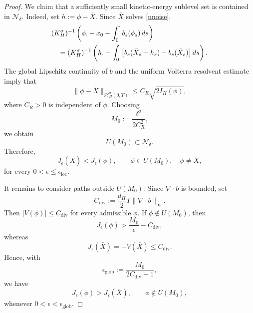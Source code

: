 \documentclass[preprint,12pt]{elsarticle}
\theoremstyle{definition}
\theoremstyle{plain}
\begin{document}
\begin{proof}
We claim that a sufficiently small kinetic-energy sublevel set is
contained in $\mathcal N_\delta$. Indeed, set
$h:=\phi-\bar X$. Since $\bar X$ solves \eqref{nnoise},
\begin{align}
& (K_H^\sigma)^{-1}
\left(
    \phi_\cdot-x_0
    -
    \int_0^\cdot b_s(\phi_s)\,ds
\right)
\notag\\
&\quad=
(K_H^\sigma)^{-1}
\left(
    h_\cdot
    -
    \int_0^\cdot
    \bigl[
        b_s(\bar X_s+h_s)-b_s(\bar X_s)
    \bigr]\,ds
\right).
\label{eq:residual-difference}
\end{align}
The global Lipschitz continuity of $b$ and the uniform Volterra
resolvent estimate imply that
\begin{equation}
\label{eq:H-distance-controlled-by-IH}
    \|\phi-\bar X\|_{\mathcal H_H^\sigma(0,T)}
    \leq
    C_R\sqrt{2I_H(\phi)},
\end{equation}
where $C_R>0$ is independent of $\phi$. Choosing
\begin{equation}
\label{eq:M0-def}
    M_0
    :=
    \frac{\delta^2}{2C_R^2},
\end{equation}
we obtain
\begin{equation*}
    U(M_0)\subset\mathcal N_\delta.
\end{equation*}
Therefore,
\begin{equation}
\label{eq:min-on-UM0}
    J_\epsilon(\bar X)
    <
    J_\epsilon(\phi),
    \qquad
    \phi\in U(M_0),\quad
    \phi\neq\bar X,
\end{equation}
for every $0<\epsilon\leq\epsilon_{\mathrm{loc}}$.

It remains to consider paths outside $U(M_0)$. Since
$\nabla\!\cdot b$ is bounded, set
\begin{equation*}
    C_{\mathrm{div}}
    :=
    \frac{d_H}{2}
    T
    \|\nabla\!\cdot b\|_\infty.
\end{equation*}
Then $|V(\phi)|\leq C_{\mathrm{div}}$ for every admissible $\phi$.
If $\phi\notin U(M_0)$, then
\begin{equation}
\label{eq:J-lower-outside}
    J_\epsilon(\phi)
    >
    \frac{M_0}{\epsilon}
    -
    C_{\mathrm{div}},
\end{equation}
whereas
\begin{equation*}
    J_\epsilon(\bar X)
    =
    -V(\bar X)
    \leq
    C_{\mathrm{div}}.
\end{equation*}
Hence, with
\begin{equation}
\label{eq:eps-global}
    \epsilon_{\mathrm{glob}}
    :=
    \frac{M_0}{2C_{\mathrm{div}}+1},
\end{equation}
we have
\begin{equation*}
    J_\epsilon(\phi)>J_\epsilon(\bar X),
    \qquad
    \phi\notin U(M_0),
\end{equation*}
whenever $0<\epsilon<\epsilon_{\mathrm{glob}}$.


\end{proof}
\end{document}
